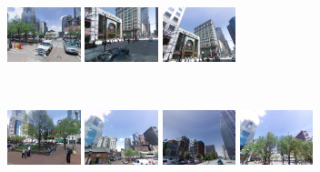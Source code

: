 \begin{figure}[t!]
\begin{minipage}{0.75\linewidth}
\begin{minipage}{\linewidth}
                \colorbox{myGreen}{\includegraphics[height=16mm]{imgs/ex2/FVsvm2.jpg}}
                \colorbox{myGreen}{\includegraphics[height=16mm]{imgs/ex2/FVsvm3.jpg}}
                \colorbox{myGreen}{\includegraphics[height=16mm]{imgs/ex2/FVsvm4.jpg}}
            \end{minipage}
            \\
            \begin{minipage}{\linewidth}
                \colorbox{myRed}{\includegraphics[height=16mm]{imgs/ex2/FV1.jpg}}
                \colorbox{myRed}{\includegraphics[height=16mm]{imgs/ex2/FV2.jpg}}
                \colorbox{myRed}{\includegraphics[height=16mm]{imgs/ex2/FV3.jpg}}
                \colorbox{myRed}{\includegraphics[height=16mm]{imgs/ex2/FV4.jpg}}
            \end{minipage} 
        \end{minipage}
        \vspace{3mm}
        \\

\end{figure}
